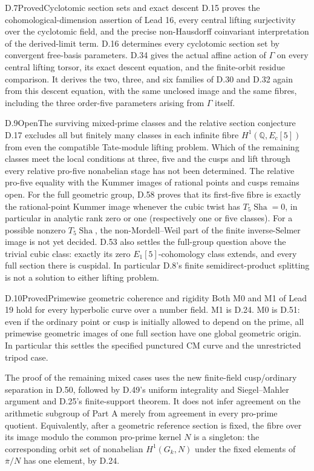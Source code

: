 \begin{statement}{D.7}{Proved}{Cyclotomic section sets and exact descent}
D.15 proves the cohomological-dimension assertion
of Lead 16, every central lifting surjectivity
over the cyclotomic field, and the precise
non-Hausdorff coinvariant interpretation of
the derived-limit term. D.16 determines every cyclotomic section set by
convergent free-basis parameters. D.34 gives the
actual affine action of \(\Gamma\) on every
central lifting torsor, its exact descent
equation, and the finite-orbit residue comparison.
It derives the two, three, and six families of
D.30 and D.32 again from this descent equation,
with the same unclosed image and the same
fibres, including the three order-five
parameters arising from \(\Gamma\) itself.
\end{statement}

\begin{statement}{D.9}{Open}{The surviving mixed-prime classes and the relative section conjecture}
D.17 excludes all but finitely many classes in
each infinite fibre \(H^1(\mathbb Q,E_c[5])\)
from even the compatible Tate-module lifting
problem. Which of the remaining classes meet
the local conditions at three, five and the
cusps and lift through every relative pro-five
nonabelian stage has not been determined.
The relative pro-five equality with the Kummer
images of rational points and cusps remains open.
For the full geometric group, D.58 proves that
its first-five fibre is exactly the rational-point
Kummer image whenever the cubic twist has
\(T_5\operatorname{Sha}=0\), in particular in analytic rank
zero or one (respectively one or five classes).
For a possible nonzero \(T_5\operatorname{Sha}\), the
non-Mordell--Weil part of the finite inverse-Selmer
image is not yet decided. D.53 also settles the full-group
question above the trivial cubic class:
exactly its zero \(E_1[5]\)-cohomology class
extends, and every full section there is
cuspidal. In particular
D.8's finite semidirect-product splitting is
not a solution to either lifting problem.
\end{statement}

\begin{statement}{D.10}{Proved}{Primewise geometric coherence and rigidity}
Both M0 and M1 of Lead 19 hold for every
hyperbolic curve over a number field.
M1 is D.24. M0 is D.51: even if the
ordinary point or cusp is initially
allowed to depend on the prime, all
primewise geometric images of one full
section have one global geometric origin.
In particular this settles the specified
punctured CM curve and the unrestricted
tripod case.

The proof of the remaining mixed cases
uses the new finite-field cusp/ordinary
separation in D.50, followed by D.49's
uniform integrality and Siegel--Mahler
argument and D.25's finite-support theorem.
It does not infer agreement on the
arithmetic subgroup of Part A merely
from agreement in every pro-prime quotient.
Equivalently, after a geometric reference
section is fixed, the fibre over its image
modulo the common pro-prime kernel \(N\)
is a singleton: the corresponding orbit
set of nonabelian \(H^1(G_k,N)\) under
the fixed elements of \(\overline\pi/N\)
has one element, by D.24.
\end{statement}

